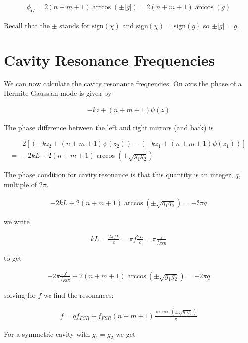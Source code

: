 \documentclass[12pt]{article}
\begin{document}
\begin{align}
\phi_G = 2(n+m+1)\arccos(\pm |g|) = 2(n+m+1)\arccos(g)
\end{align}

Recall that the $\pm$ stands for $\text{sign}(\chi)$ and $\text{sign}(\chi) = \text{sign}(g)$ so $\pm |g| = g$.

\section{Cavity Resonance Frequencies}

We can now calculate the cavity resonance frequencies. 
On axis the phase of a Hermite-Gaussian mode is given by

\begin{align}
-kz + (n+m+1)\psi(z)
\end{align}

The phase difference between the left and right mirrors (and back) is

\begin{align}
&2\left[\left(-kz_2 + (n+m+1)\psi(z_2) \right) - \left(-kz_1 + (n+m+1)\psi(z_1)\right)\right]\\
=& -2 kL + 2(n + m + 1)\arccos(\pm\sqrt{g_1g_2})
\end{align}

The phase condition for cavity resonance is that this quantity is an integer, $q$, multiple of $2\pi$.

\begin{align}
-2 kL + 2(n+m+1)\arccos(\pm\sqrt{g_1g_2}) = -2\pi q
\end{align}

we write

\begin{align}
kL = \frac{2\pi f L}{c} = \pi f \frac{2L}{c} = \pi \frac{f}{f_{FSR}}
\end{align}

to get

\begin{align}
-2\pi \frac{f}{f_{FSR}} + 2(n+m+1)\arccos(\pm\sqrt{g_1g_2}) = -2\pi q
\end{align}

solving for $f$ we find the resonances:

\begin{align}
f = q f_{FSR} + f_{FSR}(n+m+1)\frac{\arccos(\pm\sqrt{g_1g_2})}{\pi}
\end{align}

For a symmetric cavity with $g_1=g_2$ we get
\end{document}
